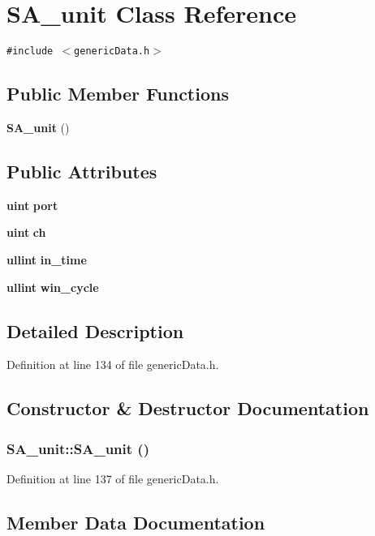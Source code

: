 \section{SA\_\-unit Class Reference}
\label{classSA__unit}
{\tt \#include $<$genericData.h$>$}

\subsection*{Public Member Functions}
\begin{CompactItemize}
\item 
{\bf SA\_\-unit} ()
\end{CompactItemize}
\subsection*{Public Attributes}
\begin{CompactItemize}
\item 
{\bf uint} {\bf port}
\item 
{\bf uint} {\bf ch}
\item 
{\bf ullint} {\bf in\_\-time}
\item 
{\bf ullint} {\bf win\_\-cycle}
\end{CompactItemize}


\subsection{Detailed Description}


Definition at line 134 of file genericData.h.

\subsection{Constructor \& Destructor Documentation}
\subsubsection[{SA\_\-unit}]{\setlength{\rightskip}{0pt plus 5cm}SA\_\-unit::SA\_\-unit ()\hspace{0.3cm}{\tt  [inline]}}\label{classSA__unit_3eff7d0c584bc8bd2d1154c5bd35648f}




Definition at line 137 of file genericData.h.

\subsection{Member Data Documentation}
